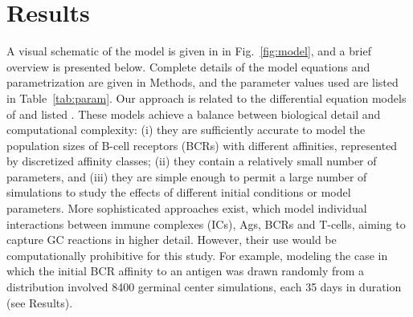 \documentclass[utf8]{frontiersHLTH}%
\newcommand{\fig}[1]{Fig.~\ref{fig:#1}}
\newcommand{\tab}[1]{Table~\ref{tab:#1}}
\begin{document}
\section{Results}
\label{sec:results}
A visual schematic of the model is given in in \fig{model}, and a brief overview is presented below. 
Complete details of the model equations and parametrization are given in Methods, and
the parameter values used are listed in \tab{param}.
Our approach is related to the differential equation models of \citet{kepler93} and listed
\citet{oprea97}. 
These models achieve a balance between biological detail
and computational complexity: 
(i) they are sufficiently accurate to
model the population sizes of B-cell receptors (BCRs) with different
affinities, represented by discretized affinity classes; (ii) they
contain a relatively small number of parameters, and (iii) they are simple enough
to permit a large number of simulations to study the effects of
different initial conditions or model parameters.\cite{kepler93,oprea97}
More sophisticated approaches exist, which model individual interactions
between immune complexes (ICs), Ags, BCRs and T-cells, aiming
to capture GC reactions in higher detail.\cite{meyer-hermann02,meyer-hermann12}
However, their use would be computationally prohibitive for this study. For example,
modeling the case in which the initial BCR affinity to an antigen was drawn randomly from a distribution
involved 8400 germinal center simulations, each 35 days in duration (see Results).
\end{document}
